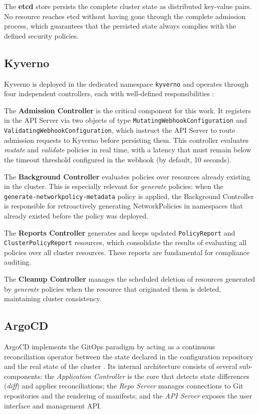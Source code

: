 The \textbf{etcd} store persists the complete cluster state as distributed key-value pairs. No resource reaches etcd without having gone through the complete admission process, which guarantees that the persisted state always complies with the defined security policies.

\subsection{Kyverno}

Kyverno is deployed in the dedicated namespace \texttt{kyverno} and operates through four independent controllers, each with well-defined responsibilities \cite{kyverno_docs}:

The \textbf{Admission Controller} is the critical component for this work. It registers in the API Server via two objects of type \texttt{Mutating\-Webhook\-Configuration} and \texttt{Validating\-Webhook\-Configuration}, which instruct the API Server to route admission requests to Kyverno before persisting them. This controller evaluates \textit{mutate} and \textit{validate} policies in real time, with a latency that must remain below the timeout threshold configured in the webhook (by default, 10 seconds).

The \textbf{Background Controller} evaluates policies over resources already existing in the cluster. This is especially relevant for \textit{generate} policies: when the \texttt{generate-networkpolicy-metadata} policy is applied, the Background Controller is responsible for retroactively generating NetworkPolicies in namespaces that already existed before the policy was deployed.

The \textbf{Reports Controller} generates and keeps updated \texttt{PolicyReport} and \texttt{ClusterPolicyReport} resources, which consolidate the results of evaluating all policies over all cluster resources. These reports are fundamental for compliance auditing.

The \textbf{Cleanup Controller} manages the scheduled deletion of resources generated by \textit{generate} policies when the resource that originated them is deleted, maintaining cluster consistency.

\subsection{ArgoCD}

ArgoCD implements the GitOps paradigm by acting as a continuous reconciliation operator between the state declared in the configuration repository and the real state of the cluster \cite{argocd_docs}. Its internal architecture consists of several sub-components: the \textit{Application Controller} is the core that detects state differences (\textit{diff}) and applies reconciliations; the \textit{Repo Server} manages connections to Git repositories and the rendering of manifests; and the \textit{API Server} exposes the user interface and management API.

